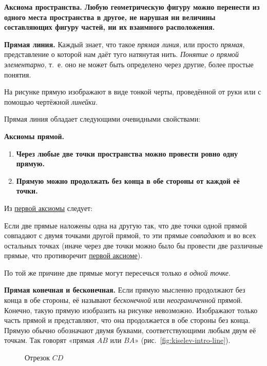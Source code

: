 \textbf{Аксиома пространства. Любую геометрическую фигуру можно перенести из одного места пространства в другое, не нарушая ни величины составляющих фигуру частей, ни их взаимного расположения.}

 \textbf{Прямая линия.} Каждый знает, что такое \emph{прямая линия}, или просто \emph{прямая}, представление о которой нам даёт туго натянутая нить. \emph{Понятие о прямой элементарно}, т.~е. оно не может быть определено через другие, более простые понятия.

На рисунке прямую изображают в виде тонкой черты, проведённой от руки или с помощью чертёжной \emph{линейки}.

Прямая линия обладает следующими очевидными свойствами:

\textbf{Аксиомы прямой.}

\begin{enumerate}[label=\arabic*),ref=\arabic*]
    \item\label{item:line-through-two-points} \textbf{Через любые две точки пространства можно провести ровно одну прямую.}
    \item \textbf{Прямую можно продолжать без конца в обе стороны от каждой её точки.}
\end{enumerate}

Из \hyperref[item:line-through-two-points]{первой аксиомы} следует:

Если две прямые наложены одна на другую так, что две точки одной прямой совпадают с двумя точками другой прямой, то эти прямые \emph{совпадают} и во всех остальных точках (иначе через две точки можно было бы провести две различные прямые, что противоречит \hyperref[item:line-through-two-points]{первой аксиоме}).

По той же причине две прямые могут пересечься только \emph{в одной точке}.

 \textbf{Прямая конечная и бесконечная.} Если прямую мысленно продолжают без конца в обе стороны, её называют \emph{бесконечной} или \emph{неограниченной} прямой. Конечно, такую прямую изобразить на рисунке
невозможно. Изображают только часть прямой и представляют, что она продолжается в обе стороны без конца. Прямую обычно обозначают двумя буквами, соответствующими любым двум её точкам. Так говорят «прямая \(AB\) или \(BA\)» (рис.~\ref{fig:kiselev-intro-line}).

\begin{figure}[htbp]
    \centering
    \captionsetup{name=Рис.,labelsep=period}
    \begin{minipage}[t]{0.46\linewidth}
        \centering
        \captionsetup{type=figure}
        
        \caption{Прямая \(AB\) или \(BA\)}
        \label{fig:kiselev-intro-line}
    \end{minipage}\hfill
    \begin{minipage}[t]{0.46\linewidth}
        \centering
        \captionsetup{type=figure}
        
        \caption{Отрезок \(CD\)}
        \label{fig:kiselev-intro-segment}
    \end{minipage}
\end{figure}

